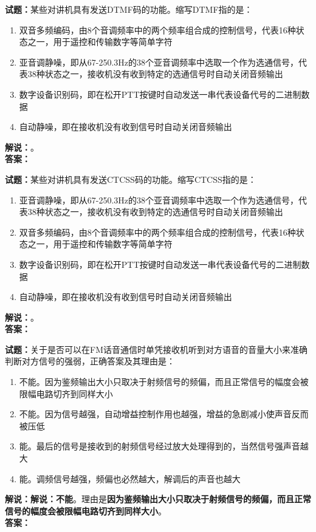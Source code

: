\documentclass{ctexbook}
\begin{document}
\bigskip

\noindent\textbf{试题：}某些对讲机具有发送DTMF码的功能。缩写DTMF指的是：
\begin{enumerate}[leftmargin=3em]
  \item 双音多频编码，由8个音调频率中的两个频率组合成的控制信号，代表16种状态之一，用于遥控和传输数字等简单字符
  \item 亚音调静噪，即从67-250.3Hz的38个亚音调频率中选取一个作为选通信号，代表38种状态之一，接收机没有收到特定的选通信号时自动关闭音频输出
  \item 数字设备识别码，即在松开PTT按键时自动发送一串代表设备代号的二进制数据
  \item 自动静噪，即在接收机没有收到信号时自动关闭音频输出
\end{enumerate}
\noindent\textbf{解说：}\textbf{}。\\\noindent\textbf{答案：}

\bigskip

\noindent\textbf{试题：}某些对讲机具有发送CTCSS码的功能。缩写CTCSS指的是：
\begin{enumerate}[leftmargin=3em]
  \item 亚音调静噪，即从67-250.3Hz的38个亚音调频率中选取一个作为选通信号，代表38种状态之一，接收机没有收到特定的选通信号时自动关闭音频输出
  \item 双音多频编码，由8个音调频率中的两个频率组合成的控制信号，代表16种状态之一，用于遥控和传输数字等简单字符
  \item 数字设备识别码，即在松开PTT按键时自动发送一串代表设备代号的二进制数据
  \item 自动静噪，即在接收机没有收到信号时自动关闭音频输出
\end{enumerate}
\noindent\textbf{解说：}\textbf{}。\\\noindent\textbf{答案：}

\bigskip

\noindent\textbf{试题：}关于是否可以在FM话音通信时单凭接收机听到对方语音的音量大小来准确判断对方信号的强弱，正确答案及其理由是：
\begin{enumerate}[leftmargin=3em]
  \item 不能。因为鉴频输出大小只取决于射频信号的频偏，而且正常信号的幅度会被限幅电路切齐到同样大小
  \item 不能。因为信号越强，自动增益控制作用也越强，增益的急剧减小使声音反而被压低
  \item 能。最后的信号是接收到的射频信号经过放大处理得到的，当然信号强声音越大
  \item 能。调频信号越强，频偏也必然越大，解调后的声音也越大
\end{enumerate}
\noindent\textbf{解说：}\noindent\textbf{解说：}\textbf{不能}。理由是\textbf{因为鉴频输出大小只取决于射频信号的频偏，而且正常信号的幅度会被限幅电路切齐到同样大小}。\\\noindent\textbf{答案：}
\end{document}

